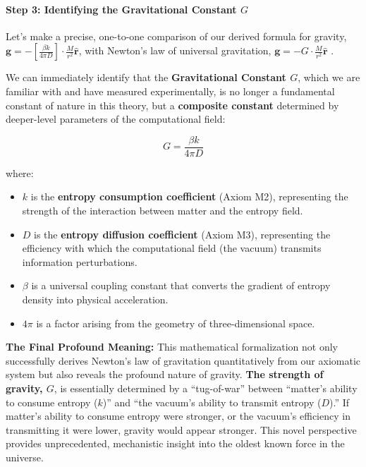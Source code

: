 \documentclass[11pt, a4paper]{article}
\begin{document}
\paragraph{Step 3: Identifying the Gravitational Constant $G$}

Let's make a precise, one-to-one comparison of our derived formula for gravity, $\mathbf{g} = - \left[\frac{\beta k}{4\pi D}\right] \cdot \frac{M}{r^2} \hat{\mathbf{r}}$, with Newton's law of universal gravitation, $\mathbf{g} = - G \cdot \frac{M}{r^2} \hat{\mathbf{r}}$ \cite{Newton1687}.

We can immediately identify that the \textbf{Gravitational Constant $G$}, which we are familiar with and have measured experimentally, is no longer a fundamental constant of nature in this theory, but a \textbf{composite constant} determined by deeper-level parameters of the computational field:

\[
G = \frac{\beta k}{4\pi D}
\]

where:
\begin{itemize}
    \item $k$ is the \textbf{entropy consumption coefficient} (Axiom M2), representing the strength of the interaction between matter and the entropy field.
    \item $D$ is the \textbf{entropy diffusion coefficient} (Axiom M3), representing the efficiency with which the computational field (the vacuum) transmits information perturbations.
    \item $\beta$ is a universal coupling constant that converts the gradient of entropy density into physical acceleration.
    \item $4\pi$ is a factor arising from the geometry of three-dimensional space.
\end{itemize}

\textbf{The Final Profound Meaning:}
This mathematical formalization not only successfully derives Newton's law of gravitation quantitatively from our axiomatic system but also reveals the profound nature of gravity. \textbf{The strength of gravity, $G$}, is essentially determined by a ``tug-of-war'' between ``matter's ability to consume entropy ($k$)'' and ``the vacuum's ability to transmit entropy ($D$).'' If matter's ability to consume entropy were stronger, or the vacuum's efficiency in transmitting it were lower, gravity would appear stronger. This novel perspective provides unprecedented, mechanistic insight into the oldest known force in the universe.
\end{document}
